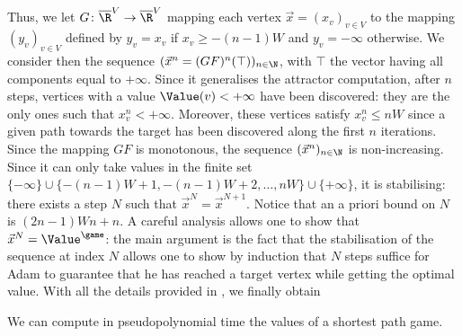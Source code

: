 Thus, we let $G\colon\overline\R^V\to\overline\R^V$ mapping each
vertex $\vec x = (x_v)_{v\in V}$ to the mapping $(y_v)_{v\in V}$
defined by $y_v = x_v$ if $x_v\geq -(n-1)W$ and $y_v=-\infty$
otherwise. We consider then the sequence
$(\vec x^n = (GF)^n(\top))_{n\in \N}$, with $\top$ the vector having
all components equal to $+\infty$. Since it generalises the attractor
computation, after $n$ steps, vertices with a value
$\Value(v)<+\infty$ have been discovered: they are the only ones such
that $x^{n}_v < +\infty$. Moreover, these vertices satisfy
$x^{n}_v\leq n W$ since a given path towards the target has been
discovered along the first $n$ iterations. Since the mapping $GF$ is
monotonous, the sequence $(\vec x^n)_{n\in \N}$ is
non-increasing. Since it can only take values in the finite set
$\{-\infty\}\cup \{-(n-1) W+1, -(n-1) W+2,\ldots,nW\}
\cup\{+\infty\}$, it is stabilising: there exists a step $N$ such that
$\vec x^N=\vec x^{N+1}$. Notice that an a priori bound on $N$ is
$(2n-1)W n + n$. A careful analysis allows one to show that
$\vec x^N=\Value^\game$: the main argument is the fact that the
stabilisation of the sequence at index $N$ allows one to show by
induction that $N$ steps suffice for Adam to guarantee that he has
reached a target vertex while getting the optimal value. With all the
details provided in \cite{Brihaye&Geeraerts&HaddadA&Monmege:2017}, we
finally obtain
\begin{theorem}\label{4-thm:SP-pseudopoly-algo}
  We can compute in pseudopolynomial time the values of a
  shortest path game. 
\end{theorem}


